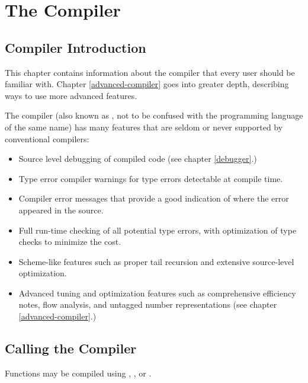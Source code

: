 \chapter{The Compiler}

\section{Compiler Introduction}

This chapter contains information about the compiler that every \cmucl{} user
should be familiar with.  Chapter \ref{advanced-compiler} goes into greater
depth, describing ways to use more advanced features.

The \cmucl{} compiler (also known as \python{}, not to be confused
with the programming language of the same name) has many features
that are seldom or never supported by conventional \llisp{}
compilers:

\begin{itemize} 
\item Source level debugging of compiled code (see chapter
  \ref{debugger}.)
  
\item Type error compiler warnings for type errors detectable at
  compile time.
  
\item Compiler error messages that provide a good indication of where
  the error appeared in the source.
  
\item Full run-time checking of all potential type errors, with
  optimization of type checks to minimize the cost.
  
\item Scheme-like features such as proper tail recursion and extensive
  source-level optimization.
  
\item Advanced tuning and optimization features such as comprehensive
  efficiency notes, flow analysis, and untagged number representations
  (see chapter \ref{advanced-compiler}.)
\end{itemize}


\section{Calling the Compiler}

Functions may be compiled using , , or 
.  

